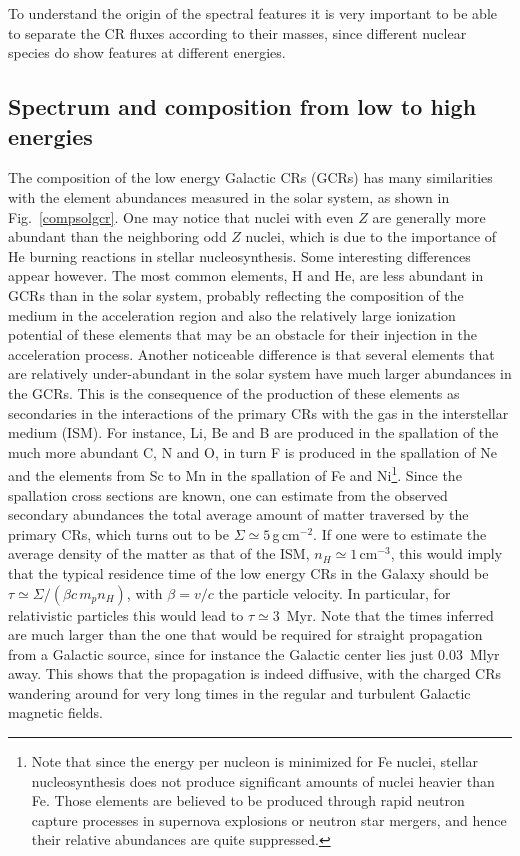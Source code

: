 \documentclass[twoside,12pt]{article}
\begin{document}
To understand the origin of the spectral features it is very important to be able to separate the CR fluxes according to their masses, since different nuclear species do show features at different energies.

 \subsection{Spectrum and  composition from low to high energies}
The composition of the low energy Galactic CRs (GCRs) has many similarities with the element abundances measured in the solar system, as shown in Fig.~\ref{compsolgcr}. One may notice that nuclei with even $Z$ are generally more abundant than the neighboring odd $Z$ nuclei, which is due to the importance of He burning reactions in stellar nucleosynthesis. 
Some interesting differences appear however. The most common elements, H and He, are less abundant in GCRs than in the solar system, probably reflecting the composition of the medium in the acceleration region and also the relatively large ionization potential of these elements that may be an obstacle for their injection in the acceleration process. Another noticeable difference is that several elements that are relatively under-abundant in the solar system have much larger abundances in the GCRs. This is the consequence of the production of these elements as secondaries in the interactions of the primary CRs with the gas in the interstellar medium (ISM). For instance, Li, Be and B are produced in the spallation of the much more abundant C, N and O, in turn F is produced in the spallation of Ne and the elements from Sc to Mn in the spallation of Fe and Ni\footnote{Note that since the energy per nucleon is minimized for Fe nuclei, stellar nucleosynthesis does not produce significant amounts of nuclei heavier than Fe. Those elements are believed to be produced through rapid neutron capture processes in supernova explosions or neutron star mergers, and hence their relative abundances are quite suppressed.}. Since the spallation cross sections are known, one can estimate from the observed secondary abundances the total average amount of matter traversed by the primary CRs,   which turns out to be $\Sigma\simeq 5$\,g\,cm$^{-2}$. If one were to estimate the average density of the matter as that of the ISM, $n_H\simeq 1$\,cm$^{-3}$, this would imply that the typical residence time of the low energy CRs in the Galaxy should be $\tau\simeq \Sigma/(\beta c\, m_p n_H)$, with $\beta=v/c$ the particle velocity. In particular, for relativistic particles  this would lead to $\tau\simeq  3$~Myr. Note that the times inferred are much larger than the one that would be required for straight propagation from a Galactic source, since for instance the Galactic center lies just 0.03~Mlyr away. This shows that the propagation is indeed diffusive, with the charged CRs wandering around for very long times in the regular and turbulent Galactic magnetic fields.
\end{document}
